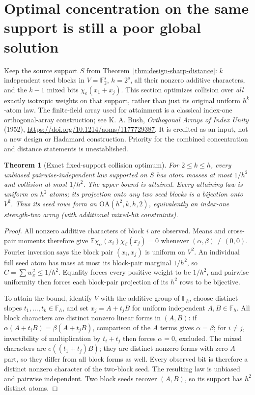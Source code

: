 \documentclass[11pt]{article}
\newtheorem{theorem}{Theorem}[section]
\begin{document}
\section{Optimal concentration on the same support is still a poor global solution}
\label{sec:design-concentration}
Keep the source support $S$ from Theorem~\ref{thm:design-sharp-distance}:
$k$ independent seed blocks in $V=\mathbb F_2^s$, $h=2^s$, all their
nonzero additive characters, and the $k-1$ mixed bits
$\chi_e(x_1+x_j)$. This section optimizes collision over \emph{all}
exactly isotropic weights on that support, rather than just its original
uniform $h^k$-atom law. The finite-field array used for attainment is a
classical index-one orthogonal-array construction; see K. A. Bush,
\emph{Orthogonal Arrays of Index Unity} (1952),
\url{https://doi.org/10.1214/aoms/1177729387}. It is credited as an
input, not a new design or Hadamard construction. Priority for the
combined concentration and distance statements is unestablished.

\begin{theorem}[Exact fixed-support collision optimum]
\label{thm:design-face-optimum}
For $2\le k\le h$, every unbiased pairwise-independent law supported
on $S$ has atom masses at most $1/h^2$ and collision at most $1/h^2$.
The upper bound is attained. Every attaining law is uniform on $h^2$
atoms; its projection onto any two seed blocks is a bijection onto
$V^2$. Thus its seed rows form an $\mathrm{OA}(h^2,k,h,2)$, equivalently
an index-one strength-two array (with additional mixed-bit constraints).
\end{theorem}
\begin{proof}
All nonzero additive characters of block $i$ are observed. Means and
cross-pair moments therefore give
$\mathbb E\chi_\alpha(x_i)\chi_\beta(x_j)=0$ whenever
$(\alpha,\beta)\ne(0,0)$. Fourier inversion says the block pair
$(x_i,x_j)$ is uniform on $V^2$. An individual full seed atom has
mass at most its block-pair marginal $1/h^2$, so
$C=\sum w_x^2\le1/h^2$. Equality forces every positive weight to be
$1/h^2$, and pairwise uniformity then forces each block-pair projection
of its $h^2$ rows to be bijective.

To attain the bound, identify $V$ with the additive group of
$\mathbb F_h$, choose distinct slopes $t_1,\ldots,t_k\in\mathbb F_h$,
and set $x_j=A+t_jB$ for uniform independent $A,B\in\mathbb F_h$.
All block characters are distinct nonzero linear forms in $(A,B)$:
if $\alpha(A+t_iB)=\beta(A+t_jB)$, comparison of the $A$ terms gives
$\alpha=\beta$; for $i\ne j$, invertibility of multiplication by
$t_i+t_j$ then forces $\alpha=0$, excluded. The mixed characters are
$e((t_1+t_j)B)$; they are distinct nonzero forms with zero $A$ part,
so they differ from all block forms as well. Every observed bit is
therefore a distinct nonzero character of the two-block seed. The
resulting law is unbiased and pairwise independent. Two block seeds
recover $(A,B)$, so its support has $h^2$ distinct atoms.
\end{proof}
\end{document}

